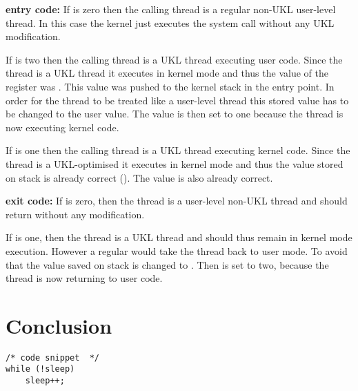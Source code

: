 \documentclass[10pt,twocolumn,a4paper]{article}
\begin{document}
      \textbf{entry code:}
      If  is zero then the calling thread is a regular non-UKL user-level thread.
      In this case the kernel just executes the system call without any UKL modification.

      If  is two then the calling thread is a UKL thread executing user code.
      Since the thread is a UKL thread it executes in kernel mode and thus the value of the 
       register was .
      This value was pushed to the kernel stack in the  entry point.
      In order for the thread to be treated like a user-level thread this stored  
      value has to be changed to the user  value.
      The  value is then set to one because the thread is now executing kernel code.

      If  is one then the calling thread is a UKL thread executing kernel code.
      Since the thread is a UKL-optimised it executes in kernel mode and thus the  value
      stored on stack is already correct ().
      The  value is also already correct.

      \textbf{exit code:}
      If  is zero, then the thread is a user-level non-UKL thread and should return
      without any modification.

      If  is one, then the thread is a UKL thread and should thus remain in 
      kernel mode execution.
      However a regular  would take the thread back to user mode.
      To avoid that the  value saved on stack is changed to .
      Then  is set to two, because the thread is now returning to user code.


\section{Conclusion}\label{sec:conclusion}


\begin{lstlisting}
/* code snippet  */
while (!sleep)
	sleep++;
\end{lstlisting}



\end{document}
